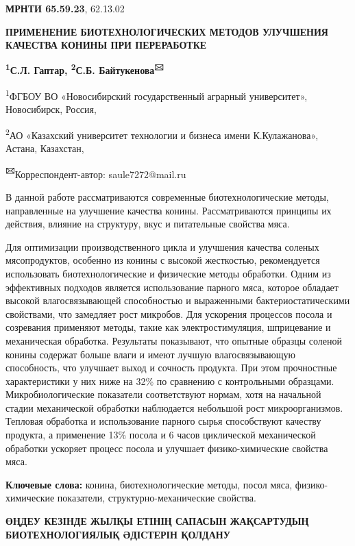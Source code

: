 









\newpage
{\bfseries МРНТИ 65.59.23}, 62.13.02

{\bfseries ПРИМЕНЕНИЕ БИОТЕХНОЛОГИЧЕСКИХ МЕТОДОВ УЛУЧШЕНИЯ КАЧЕСТВА КОНИНЫ
ПРИ ПЕРЕРАБОТКЕ}

{\bfseries \textsuperscript{1}С.Л. Гаптар, \textsuperscript{2}С.Б.
Байтукенова\textsuperscript{🖂}}

\textsuperscript{1}ФГБОУ ВО «Новосибирский государственный аграрный
университет», Новосибирск, Россия,

\textsuperscript{2}АО «Казахский университет технологии и бизнеса имени
К.Кулажанова», Астана, Казахстан,

{\bfseries \textsuperscript{🖂}}Корреспондент-автор: saule7272@mail.ru

В данной работе рассматриваются современные биотехнологические методы,
направленные на улучшение качества конины. Рассматриваются принципы их
действия, влияние на структуру, вкус и питательные свойства мяса.

Для оптимизации производственного цикла и улучшения качества соленых
мясопродуктов, особенно из конины с высокой жесткостью, рекомендуется
использовать биотехнологические и физические методы обработки. Одним из
эффективных подходов является использование парного мяса, которое
обладает высокой влагосвязывающей способностью и выраженными
бактериостатическими свойствами, что замедляет рост микробов. Для
ускорения процессов посола и созревания применяют методы, такие как
электростимуляция, шприцевание и механическая обработка. Результаты
показывают, что опытные образцы соленой конины содержат больше влаги и
имеют лучшую влагосвязывающую способность, что улучшает выход и сочность
продукта. При этом прочностные характеристики у них ниже на 32\% по
сравнению с контрольными образцами. Микробиологические показатели
соответствуют нормам, хотя на начальной стадии механической обработки
наблюдается небольшой рост микроорганизмов. Тепловая обработка и
использование парного сырья способствуют качеству продукта, а применение
13\% посола и 6 часов циклической механической обработки ускоряет
процесс посола и улучшает физико-химические свойства мяса.

{\bfseries Ключевые слова:} конина, биотехнологические методы, посол мяса,
физико-химические показатели, структурно-механические свойства.

{\bfseries ӨҢДЕУ КЕЗІНДЕ ЖЫЛҚЫ ЕТІНІҢ САПАСЫН ЖАҚСАРТУДЫҢ БИОТЕХНОЛОГИЯЛЫҚ
ӘДІСТЕРІН ҚОЛДАНУ}

